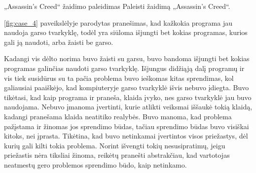 ﻿\begin{xcase}{„Assassin's Creed“ žaidimo paleidimas}
  \xcgoal
  {
    Paleisti žaidimą „Assassin's Creed“.
  }
  \xctools
  {
    \ref{fig:case_4} paveikslėlyje parodytas pranešimas, kad kažkokia programa jau naudoja garso tvarkyklę, todėl yra siūloma išjungti bet kokias programas, kurios gali ją naudoti, arba žaisti be garso.

  }
  \xcresult
  {
    Kadangi vis dėlto norima buvo žaisti su garsu, buvo bandoma išjungti bet kokias programas galinčias naudoti garso tvarkyklę. Išjungus didžiąją dalį programų ir vis tiek susidūrus su ta pačia problema buvo ieškomas kitas sprendimas, kol galiausiai paaiškėjo, kad kompiuteryje garso tvarkyklė išvis nebuvo įdiegta.
  }
  \xcprinciples
  {
	{
	  Buvo tikėtasi, kad kaip programa ir praneša, klaida įvyko, nes garso tvarkyklė jau buvo naudojama.
	}
	{
	  Nebuvo įmanoma įvertinti, kurie atlikti veiksmai iššaukė tokią klaidą, kadangi pranešama klaida neatitiko realybės.
	}
	{
	  Buvo manoma, kad problema pažįstama ir žinomas jos sprendimo būdas, tačiau sprendimo būdas buvo visiškai kitoks, nei įprasta.
	}
  }
  \xcthoughts
  {
    Tikėtina, kad buvo netinkamai įvertintos visos priežastys, dėl kurių gali kilti tokia problema. Norint išvengti tokių nesusipratimų, jeigu priežastis nėra tiksliai žinoma, reikėtų pranešti abstrakčiau, kad vartotojas neatmestų gero problemos sprendimo būdo, kaip netinkamo.
  }
\end{xcase}